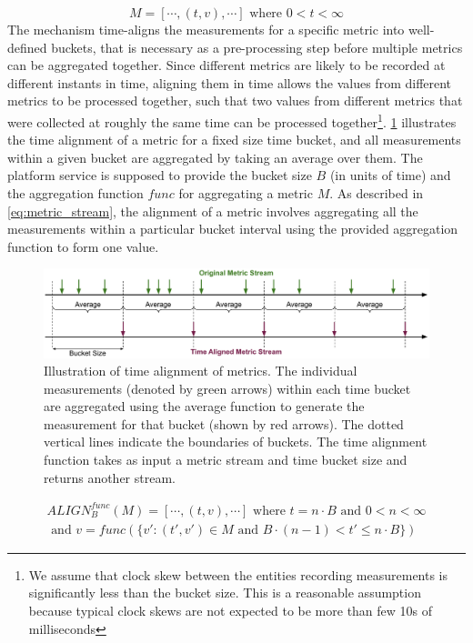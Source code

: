 \begin{itemize}
\begin{equation}
M = \left[ \cdots , \left( t, v \right) , \cdots \right] \text{ where } 0 < t < \infty
\label{eq:metric_stream}
\end{equation}
The mechanism time-aligns the measurements for a specific metric into well-defined buckets, that is necessary as a pre-processing step before multiple metrics can be aggregated together. Since different metrics are likely to be recorded at different instants in time, aligning them in time allows the values from different metrics to be processed together, such that two values from different metrics that were collected at roughly the same time can be processed together\footnote{We assume that clock skew between the entities recording measurements is significantly less than the bucket size. This is a reasonable assumption because typical clock skews are not expected to be more than few 10s of milliseconds}. \cref{fig:time_alignment} illustrates the time alignment of a metric for a fixed size time bucket, and all measurements within a given bucket are aggregated by taking an average over them. The platform service is supposed to provide the bucket size $B$ (in units of time) and the aggregation function $func$ for aggregating a metric $M$. As described in \cref{eq:metric_stream}, the alignment of a metric involves aggregating all the measurements within a particular bucket interval using the provided aggregation function to form one value.
\begin{figure}
\centering
\includegraphics[width=\linewidth]{figures/mechanisms/monitoring/time_alignment}
\caption{Illustration of time alignment of metrics. The individual measurements (denoted by green arrows) within each time bucket are aggregated using the average function to generate the measurement for that bucket (shown by red arrows). The dotted vertical lines indicate the boundaries of buckets. The time alignment function takes as input a metric stream and time bucket size and returns another stream.}
\label{fig:time_alignment}
\end{figure}
\begin{multline}
ALIGN^{func}_{B} \left( M \right) = \left[ \cdots , \left( t, v \right) , \cdots \right] \text{ where } t = n\cdot B \text{ and } 0 < n < \infty \\ \text{ and } v = func \left( \{ v' : \left( t', v'\right) \in M \text{ and } B\cdot \left( n-1\right) < t' \leq n \cdot B \} \right)
\label{eq:metric_stream}
\end{multline}


\end{itemize}
